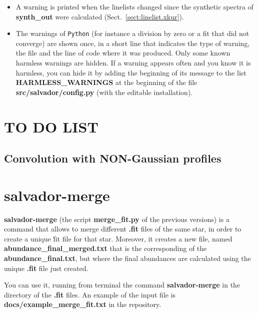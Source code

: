 \documentclass[modern]{aastex701}
\begin{document}
\begin{itemize}
    \item A warning is printed when the linelists changed since the synthetic spectra of {\bf synth\_out} were calculated (Sect.~\ref{sect:linelist.xkur}).
    \item The warnings of \texttt{Python} (for instance a division by zero or a fit that did not converge) are shown once, in a short line that indicates the type of warning, the file and the line of code where it was produced. Only some known harmless warnings are hidden. If a warning appears often and you know it is harmless, you can hide it by adding the beginning of its message to the list {\bf HARMLESS\_WARNINGS} at the beginning of the file {\bf src/salvador/config.py} (with the editable installation).
\end{itemize}

\section{TO DO LIST}
\subsection{Convolution with NON-Gaussian profiles}


{}


\appendix
\section{{\bf salvador-merge}} \label{appendix_b}
{\bf salvador-merge} (the script {\bf merge\_fit.py} of the previous versions) is a command that allows to merge different {\bf .fit} files of the same star, in order to create a unique {\.fit} file for that star. Moreover, it creates a new file, named {\bf abundance\_final\_merged.txt} that is the corresponding of the {\bf abundance\_final.txt}, but where the final abundances are calculated using the unique {\bf .fit} file just created. 

You can use it, running from terminal the command {\bf salvador-merge} in the directory of the {\bf .fit} files. An example of the input file is {\bf docs/example\_merge\_fit.txt} in the repository. 
\end{document}

